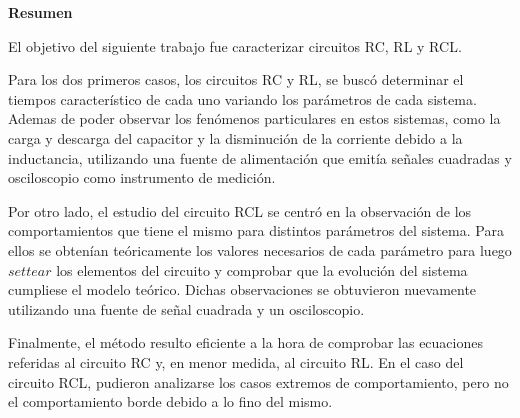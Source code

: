 \begin{titlepage}
\begin{center}
\large{\textbf{Resumen}}

\small{El objetivo del siguiente trabajo fue caracterizar circuitos RC, RL y RCL. 

Para los dos primeros casos, los circuitos RC y RL, se buscó determinar el tiempos característico de cada uno variando los parámetros de cada sistema. Ademas de poder observar los fenómenos particulares en estos sistemas, como la carga y descarga del capacitor y la disminución de la corriente debido a la inductancia, utilizando una fuente de alimentación que emitía señales cuadradas y osciloscopio como instrumento de medición.

Por otro lado, el estudio del circuito RCL se centró en la observación de los comportamientos que tiene el mismo para distintos parámetros del sistema. Para ellos se obtenían teóricamente los valores necesarios de cada parámetro para luego $settear$ los elementos del circuito y comprobar que la evolución del sistema cumpliese el modelo teórico. Dichas observaciones se obtuvieron nuevamente utilizando una fuente de señal cuadrada y un osciloscopio.

Finalmente, el método resulto eficiente a la hora de comprobar las ecuaciones referidas al circuito RC y, en menor medida, al circuito RL. En el caso del circuito RCL, pudieron analizarse los casos extremos de comportamiento, pero no el comportamiento borde debido a lo fino del mismo.} %

\end{center}



 

\vfill %

\end{titlepage}
%